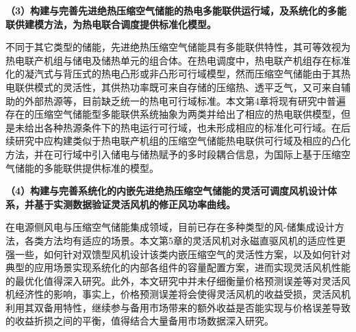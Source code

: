 \textbf{（3）构建与完善先进绝热压缩空气储能的热电多能联供运行域，及系统化的多能联供建模方法，为热电联合调度提供标准化模型。}

不同于其它类型的储能，先进绝热压缩空气储能具有多能联供特性，其可等效视为热电联产机组与储电及储热单元的组合体。在热电调度中，热电联产机组存在标准化的凝汽式与背压式的热电凸形或非凸形可行域模型，然而压缩空气储能由于其热电联供模式的灵活性，其供热功率既可来自存储的压缩热、透平乏气，又可来自辅助的外部热源等，目前缺乏统一的热电可行域标准。本文第4章将现有研究中普遍存在的压缩空气储能型多能联供系统抽象为两类并给出了相应的热电联供模型，但是未给出各种热源条件下的热电运行可行域，也未形成相应的标准化可行域。在后续研究中应构建类似于热电联产机组的压缩空气储能热电联供可行域及相应的凸化方法，并在可行域中引入储电与储热赋予的多时段耦合信息，为国际上基于压缩空气储能的多能联供提供标准的模型。


\textbf{（4）构建与完善系统化的内嵌先进绝热压缩空气储能的灵活可调度风机设计体系，并基于实测数据验证灵活风机的修正风功率曲线。}

在电源侧风电与压缩空气储能集成领域，目前已存在多种类型的风-储集成设计方法，各类方法均有适应的场景。本文第5章的灵活风机对永磁直驱风机的适应性更强一些，如何针对双馈型风机设计该类内嵌压缩空气的灵活性方案，以及如何针对典型的应用场景实现系统化的内部各组件的容量配置方案，进而实现灵活风机性能的最优化值得深入研究。此外，本文研究中并未仔细衡量价格预测误差等对灵活风机经济性的影响，事实上，价格预测误差将会使得灵活风机的收益受损，灵活风机利用其双备用特性，继续参与备用市场带来的额外收益是否能实现与价格误差导致的收益折损之间的平衡，值得结合大量备用市场数据深入研究。
